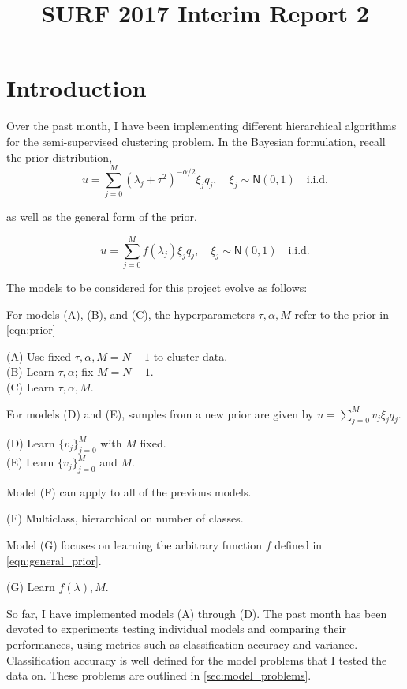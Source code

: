 \documentclass{siamart1116}
\title{SURF 2017 Interim Report 2}
\author{\TheAuthors}
\date{}
\begin{document}
\maketitle
\setlength{\unitlength}{1in}
\setlength{\parindent}{0in}

\section{Introduction}
    Over the past month, I have been implementing different hierarchical algorithms for the semi-supervised clustering problem. In the Bayesian formulation, recall the prior distribution,
    \begin{equation}
    \label{eqn:prior}
    u = \sum_{j=0}^M (\lambda_j + \tau^2)^{-\alpha/2}\xi_j q_j,\quad \xi_j\sim \mathsf{N}(0,1) \quad \text{i.i.d.}
    \end{equation}

    as well as the general form of the prior,

    \begin{equation}
    \label{eqn:general_prior}
    u = \sum_{j=0}^M f(\lambda_j)\xi_j q_j,\quad \xi_j\sim \mathsf{N}(0,1) \quad \text{i.i.d.}
    \end{equation}

    The models to be considered for this project evolve as follows:

    For models (A), (B), and (C), the hyperparameters $\tau,\alpha,M$ refer to the prior in \cref{eqn:prior}

    (A) Use fixed $\tau,\alpha, M=N-1$ to cluster data.\\
    (B) Learn $\tau,\alpha$; fix $M=N-1$.\\
    (C) Learn $\tau,\alpha,M$.

    For models (D) and (E), samples from a new prior are given by $u = \sum_{j=0}^M v_j\xi_j q_j$.

    (D) Learn $\{v_j\}_{j=0}^M$ with $M$ fixed.\\
    (E) Learn $\{v_j\}_{j=0}^M$ and $M$.

    Model (F) can apply to all of the previous models.

    (F) Multiclass, hierarchical on number of classes.

    Model (G) focuses on learning the arbitrary function $f$ defined in \cref{eqn:general_prior}. 

    (G) Learn $f(\lambda), M$.

    So far, I have implemented models (A) through (D). The past month has been devoted to experiments testing individual models and comparing their performances, using metrics such as classification accuracy and variance. Classification accuracy is well defined for the model problems that I tested the data on. These problems are outlined in \cref{sec:model_problems}.
\end{document}
